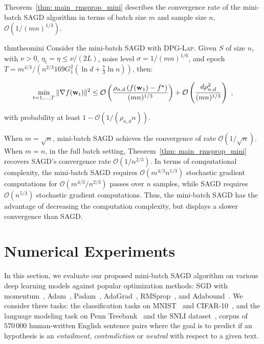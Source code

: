 \documentclass[11pt]{article}
\begin{document}
Theorem~\ref{thm: main_rmsprop_mini} 
describes the convergence rate of the mini-batch \textsc{SAGD} algorithm in terms of batch size $m$ and sample size $n$, \ie $\mathcal{O}(1/(mn)^{1/3})$.
\begin{restatable}{thm}{theomini}
\label{thm: main_rmsprop_mini}
Consider the mini-batch \textsc{SAGD} with \textsc{DPG-Lap}. 
Given $S$ of size $n$, with $\nu >0$, $\eta_t = \eta \leq \nu/(2L)$, noise level $\sigma = 1/(mn)^{1/6}$, and epoch $T = m^{4/3}/\left(n^{2/3}169G_1^2(\ln d + \frac{7}{3}\ln n)\right)$, then:
 \begin{small}
\begin{equation*}
\begin{split}
 \min_{t = 1,..., T}\|\nabla f(\mathbf{w}_t)\|^2 
 \leq\mathcal{O} \left( \frac{\rho_{n,d} \left(f(\mathbf{w}_1) - f^\star \right)}{(mn)^{1/3}} \right)+\mathcal{O} \left( \frac{d \rho_{n,d}^2}{(mn)^{1/3}}\right)~,
 \end{split}
\end{equation*}
\end{small}
with probability at least $1-\mathcal{O} \left(1/(\rho_{n,d} n)\right)$.
\end{restatable}
When $m = \sqrt{n}$, mini-batch \textsc{SAGD} achieves the convergence of rate $\mathcal{O}(1/\sqrt{n})$. When $m=n$, \ie in the full batch setting, Theorem~\ref{thm: main_rmsprop_mini} recovers \textsc{SAGD}'s convergence rate  $\mathcal{O}(1/n^{2/3})$. 
In terms of computational complexity, the mini-batch \textsc{SAGD} requires $\mathcal{O}(m^{4/3}n^{1/3})$ stochastic gradient computations for $\mathcal{O}(m^{4/3}/n^{2/3})$ passes over $n$ samples, while \textsc{SAGD} requires $\mathcal{O}(n^{5/3})$ stochastic gradient computations. 
Thus, the mini-batch \textsc{SAGD} has the advantage of decreasing the computation complexity, but displays a slower convergence than \textsc{SAGD}.





\section{Numerical Experiments} \label{sec: experiment}


In this section, we evaluate our proposed mini-batch \textsc{SAGD} algorithm on various deep learning models against popular optimization methods: SGD with momentum~\citep{qian1999momentum}, Adam~\citep{Proc:Kingma_ICLR15}, Padam~\citep{Proc:Chen_IJCAI20},  AdaGrad~\citep{Proc:Duchi_JMLR11},  RMSprop~\citep{tige12}, and Adabound~\citep{Proc:Luo_ICLR19}. 
We consider three tasks: the classification tasks on MNIST~\citep{lebo1998} and CIFAR-10~\citep{krhi2009}, and the language modeling task on Penn Treebank~\citep{mama1993} and the SNLI dataset~\citep{bowman2015large}, corpus of $570 \, 000$ human-written English sentence pairs where the goal is to predict if an hypothesis is an \emph{entailment}, \emph{contradiction} or \emph{neutral} with respect to a given text.
\end{document}
